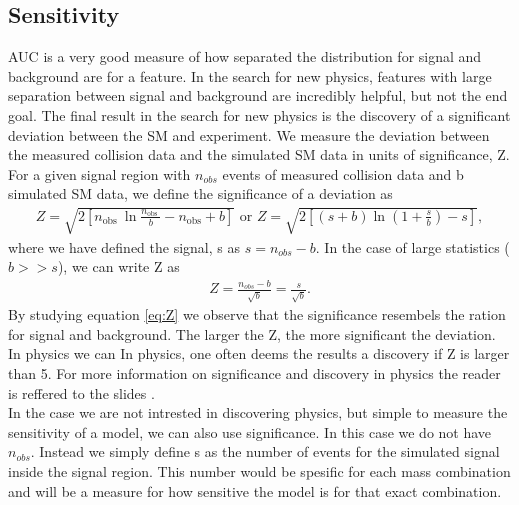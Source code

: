 \subsection{Sensitivity}\label{subsec:Sensitivity}
\ac{AUC} is a very good measure of how separated the distribution for signal and background are 
for a feature. In the search for new physics, features with large separation between signal and background
are incredibly helpful, but not the end goal. The final result in the search for new physics is the discovery 
of a significant deviation between the \ac{SM} and experiment. We measure the deviation between the measured 
collision data and the simulated \ac{SM} data in units of significance, Z. 
\\
For a given signal region with $n_{obs}$ events of measured collision data and b simulated \ac{SM} data, we define
the significance of a deviation as
\begin{align}
Z=\sqrt{2\left[n_{\text {obs }} \ln \frac{n_{\text {obs }}}{b}-n_{\mathrm{obs}}+b\right]} \text { or } 
Z=\sqrt{2\left[(s+b) \ln \left(1+\frac{s}{b}\right)-s\right]}, 
\end{align}
where we have defined the signal, s as $s = n_{obs} - b$. In the case of large statistics ($b>>s$), we can write Z 
as 
\begin{align}\label{eq:Z}
    Z=\frac{n_{o b s}-b}{\sqrt{b}} = \frac{s}{\sqrt{b}}.
\end{align}
By studying equation \ref{eq:Z} we observe that the significance resembels the ration for signal and background. The 
larger the Z, the more significant the deviation. In physics we can 
In physics, one often deems the results a discovery if Z is larger than 5.
For more information on significance and discovery in physics the reader is reffered to the slides \cite{magnar}.
\\
In the case we are not intrested in discovering physics, but simple to measure the sensitivity of a model, we can also use 
significance. In this case we do not have $n_{obs}$. Instead we simply define s as the number of events for the simulated signal 
inside the signal region. This number would be spesific for each mass combination and will be a measure for how sensitive 
the model is for that exact combination. 
